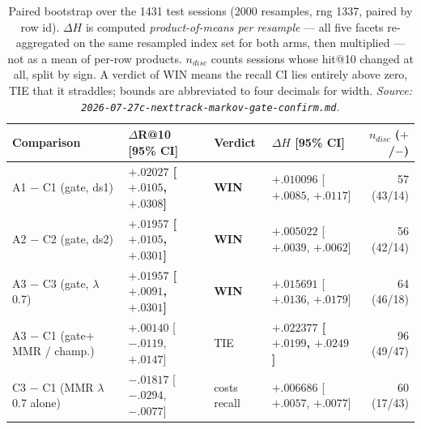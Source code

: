 \documentclass[11pt]{article}
\newcommand{\best}[1]{\textbf{#1}}
\begin{document}
\begin{table}[ht]
  \centering
  \caption{Paired bootstrap over the \num{1431} test sessions (\num{2000}
  resamples, rng \num{1337}, paired by row id). $\Delta H$ is computed
  \emph{product-of-means per resample} --- all five facets re-aggregated on the same
  resampled index set for both arms, then multiplied --- not as a mean of per-row
  products. $n_{disc}$ counts sessions whose hit@10 changed at all, split by sign.
  A verdict of WIN means the recall CI lies entirely above zero, TIE that it
  straddles; bounds are abbreviated to four decimals for width.
  \emph{Source: \texttt{2026-07-27c-nexttrack-markov-gate-confirm.md}.}}
  \label{tab:markovgate-paired}
  {\scriptsize\setlength{\tabcolsep}{4pt}\begin{tabular}{llllr}
    \toprule
    Comparison & $\Delta$R@10 [95\% CI] & Verdict & $\Delta H$ [95\% CI] & $n_{disc}$ ($+$/$-$) \\
    \midrule
    A1 $-$ C1 (gate, ds1) & \best{$+.02027$ [$+.0105$, $+.0308$]} & \best{WIN} & $+.010096$ [$+.0085$, $+.0117$] & 57 (43/14) \\
    A2 $-$ C2 (gate, ds2) & \best{$+.01957$ [$+.0105$, $+.0301$]} & \best{WIN} & $+.005022$ [$+.0039$, $+.0062$] & 56 (42/14) \\
    A3 $-$ C3 (gate, $\lambda$0.7) & \best{$+.01957$ [$+.0091$, $+.0301$]} & \best{WIN} & $+.015691$ [$+.0136$, $+.0179$] & 64 (46/18) \\
    A3 $-$ C1 (gate$+$MMR / champ.) & $+.00140$ [$-.0119$, $+.0147$] & TIE & \best{$+.022377$ [$+.0199$, $+.0249$]} & 96 (49/47) \\
    C3 $-$ C1 (MMR $\lambda$0.7 alone) & $-.01817$ [$-.0294$, $-.0077$] & costs recall & $+.006686$ [$+.0057$, $+.0077$] & 60 (17/43) \\
    \bottomrule
  \end{tabular}}
\end{table}
\end{document}
